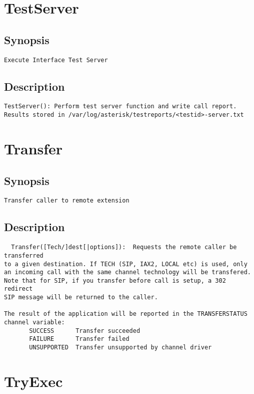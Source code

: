 \section{TestServer}
\subsection{Synopsis}
\begin{verbatim}
Execute Interface Test Server
\end{verbatim}
\subsection{Description}
\begin{verbatim}
TestServer(): Perform test server function and write call report.
Results stored in /var/log/asterisk/testreports/<testid>-server.txt
\end{verbatim}


\section{Transfer}
\subsection{Synopsis}
\begin{verbatim}
Transfer caller to remote extension
\end{verbatim}
\subsection{Description}
\begin{verbatim}
  Transfer([Tech/]dest[|options]):  Requests the remote caller be transferred
to a given destination. If TECH (SIP, IAX2, LOCAL etc) is used, only
an incoming call with the same channel technology will be transfered.
Note that for SIP, if you transfer before call is setup, a 302 redirect
SIP message will be returned to the caller.

The result of the application will be reported in the TRANSFERSTATUS
channel variable:
       SUCCESS      Transfer succeeded
       FAILURE      Transfer failed
       UNSUPPORTED  Transfer unsupported by channel driver

\end{verbatim}


\section{TryExec}
